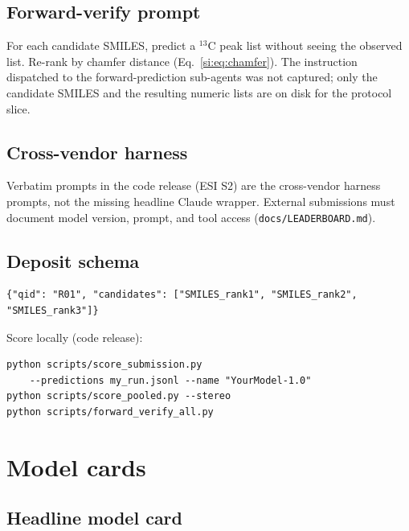 \documentclass[11pt]{article}
\newcounter{listing}
\begin{document}
\subsection{Forward-verify prompt}

For each candidate SMILES, predict a $^{13}$C peak list without seeing
the observed list.
Re-rank by chamfer distance (Eq.~\ref{si:eq:chamfer}).
The instruction dispatched to the forward-prediction sub-agents was
not captured; only the candidate SMILES and the resulting
numeric lists are on disk for the protocol slice.

\subsection{Cross-vendor harness}

Verbatim prompts in the code release (ESI S2) are the cross-vendor
harness prompts, not the missing headline Claude wrapper.
External submissions must document model version, prompt, and tool access
(\texttt{docs/LEADERBOARD.md}).

\subsection{Deposit schema}

\begin{lstlisting}[style=irexpjson]
{"qid": "R01", "candidates": ["SMILES_rank1", "SMILES_rank2", "SMILES_rank3"]}
\end{lstlisting}

Score locally (code release):
\begin{verbatim}
python scripts/score_submission.py
    --predictions my_run.jsonl --name "YourModel-1.0"
python scripts/score_pooled.py --stereo
python scripts/forward_verify_all.py
\end{verbatim}

\section{Model cards}
\label{si:card}

\subsection{Headline model card}
\end{document}
